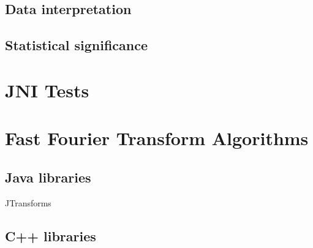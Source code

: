 \subsection{Data interpretation}
\subsection{Statistical significance}


\section{JNI Tests}

\section{Fast Fourier Transform Algorithms}

\subsection{Java libraries}
JTransforms\cite{jtransforms:benchmark}

\subsection{C++ libraries}
\cite{FFTW05}

